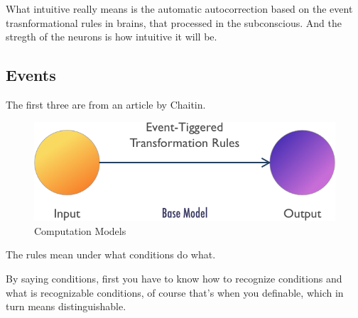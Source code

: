 What intuitive really means is the automatic autocorrection based on the event trasnformational rules in brains, that processed in the subconscious. And the stregth of the neurons is how intuitive it will be.
\subsection{Events}

The first three are from an article by Chaitin\cite{chaitin}.

%
%

%
%
%
%

\begin{figure}
  \includegraphics[width=\linewidth]{img/base.png}
  \caption{Computation Models}
  \label{fig:base}
\end{figure}

The rules mean under what conditions do what.

By saying conditions, first you have to know how to recognize conditions and what is recognizable conditions, of course that's when you definable, which in turn means distinguishable.


